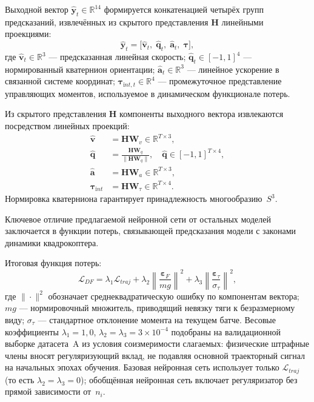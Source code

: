 Выходной вектор $\hat{\mathbf{y}}_t \in \mathbb{R}^{14}$ формируется
конкатенацией четырёх групп предсказаний, извлечённых из скрытого
представления $\mathbf{H}$ линейными проекциями:
\begin{equation}
	\hat{\mathbf{y}}_t = \bigl[
	\hat{\mathbf{v}}_t,\;
	\hat{\mathbf{q}}_t,\;
	\hat{\mathbf{a}}_t,\;
	\boldsymbol{\tau}
	\bigr],
	\label{eq:output}
\end{equation}
где $\hat{\mathbf{v}}_t \in \mathbb{R}^3$ --- предсказанная линейная скорость;
$\hat{\mathbf{q}}_t \in [-1,1]^4$ --- нормированный кватернион ориентации;
$\hat{\mathbf{a}}_t \in \mathbb{R}^3$ --- линейное ускорение в связанной
системе координат; $\boldsymbol{\tau}_{\mathrm int,t} \in \mathbb{R}^4$ ---
промежуточное представление управляющих моментов, используемое
в динамическом функционале потерь.

Из скрытого представления $\mathbf{H}$ компоненты выходного вектора
извлекаются посредством линейных проекций:
\begin{align}
	\hat{\mathbf{v}} &= \mathbf{H}\mathbf{W}_v \in \mathbb{R}^{T\times 3},
	\label{eq:vel} \\
	\hat{\mathbf{q}} &= \frac{\mathbf{H}\mathbf{W}_q}
	{\|\mathbf{H}\mathbf{W}_q\|},\quad
	\hat{\mathbf{q}} \in [-1,1]^{T\times 4},
	\label{eq:quat} \\
	\hat{\mathbf{a}} &= \mathbf{H}\mathbf{W}_a \in \mathbb{R}^{T\times 3},
	\label{eq:accel} \\
	\boldsymbol{\tau}_{\mathrm int} &= \mathbf{H}\mathbf{W}_\tau
	\in \mathbb{R}^{T\times 4}.
	\label{eq:torque}
\end{align}
Нормировка кватерниона гарантирует принадлежность многообразию~$S^3$.

Ключевое отличие предлагаемой нейронной сети от остальных моделей заключается
в функции потерь, связывающей предсказания модели с законами динамики
квадрокоптера.


Итоговая функция потерь:
\begin{equation}
	\mathcal{L}_{DF} = \lambda_1 \mathcal{L}_{traj}
	+ \lambda_2 \left\|\frac{\boldsymbol{\varepsilon}_F}{mg}\right\|^2
	+ \lambda_3 \left\|\frac{\boldsymbol{\varepsilon}_\tau}{\sigma_\tau}\right\|^2,
	\label{eq:loss_df}
\end{equation}
где $\|\cdot\|^2$ обозначает среднеквадратическую ошибку по компонентам вектора;
$mg$ --- нормировочный множитель, приводящий невязку тяги к безразмерному виду;
$\sigma_\tau$ --- стандартное отклонение момента на текущем батче.
Весовые коэффициенты $\lambda_1 = 1{,}0$, $\lambda_2 = \lambda_3 = 3{\times}10^{-4}$
подобраны на валидационной выборке датасета~A из условия соизмеримости слагаемых:
физические штрафные члены вносят регуляризующий вклад, не подавляя основной
траекторный сигнал на начальных эпохах обучения.
Базовая нейронная сеть использует только $\mathcal{L}_{traj}$
(то есть $\lambda_2=\lambda_3=0$);
обобщённая нейронная сеть включает регуляризатор без прямой зависимости от~$n_i$.

